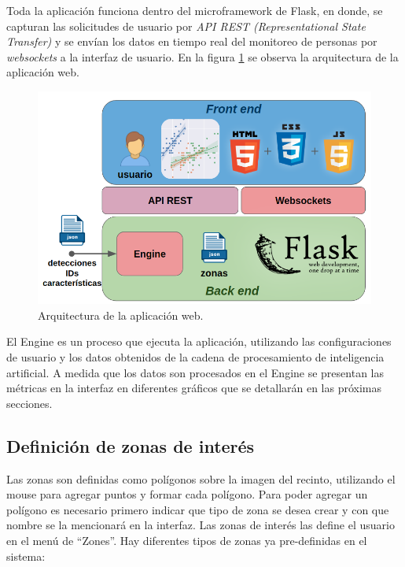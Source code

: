 Toda la aplicación funciona dentro del microframework de Flask, en donde, se capturan las solicitudes de usuario por \textit{API REST (Representational 
State Transfer)} \citep{API_REST} y se envían los datos en tiempo real del monitoreo de personas por \textit{websockets} \citep{WEBSOCKETS} a la interfaz de usuario. En la figura \ref{fig:arquitecturaWebApp} se observa la arquitectura de la aplicación web.

\begin{figure}[ht]
	\centering
	\includegraphics[scale=.6]{./Figures/arquitecturaWebApp.png}
	\caption{Arquitectura de la aplicación web.}
	\label{fig:arquitecturaWebApp}
\end{figure}

El Engine es un proceso que ejecuta la aplicación, utilizando las configuraciones de usuario y los datos obtenidos de la cadena de procesamiento de inteligencia artificial. A medida que los datos son procesados en el Engine se presentan las métricas en la interfaz en diferentes gráficos que se detallarán en las próximas secciones.

\newpage

\subsection{Definición de zonas de interés}
\label{sec:definicionZonasInteres}

Las zonas son definidas como polígonos sobre la imagen del recinto, utilizando el mouse para agregar puntos y formar cada polígono. Para poder agregar un polígono es necesario primero indicar que tipo de zona se desea crear y con que nombre se la mencionará en la interfaz. Las zonas de interés las define el usuario en el menú de ``Zones''. Hay diferentes tipos de zonas ya pre-definidas en el sistema:

